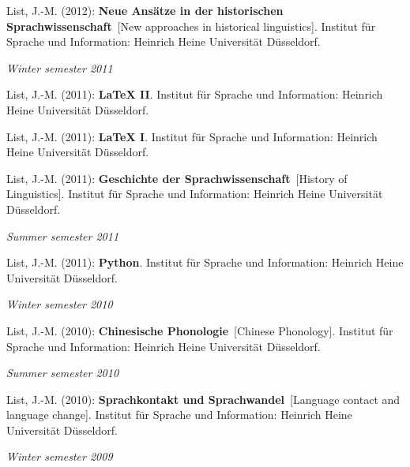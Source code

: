 \nopagebreak\noindent List, J.-M. (2012): \textbf{Neue Ansätze in der historischen Sprachwissenschaft}\ [New approaches in historical linguistics]. Institut für Sprache und Information: Heinrich Heine Universität Düsseldorf.\vspace{0.25cm}
\par
\noindent\textit{Winter semester 2011}\par\nopagebreak\vspace{0.25cm}
\nopagebreak\noindent List, J.-M. (2011): \textbf{LaTeX II}. Institut für Sprache und Information: Heinrich Heine Universität Düsseldorf.\vspace{0.25cm}
\par
\nopagebreak\noindent List, J.-M. (2011): \textbf{LaTeX I}. Institut für Sprache und Information: Heinrich Heine Universität Düsseldorf.\vspace{0.25cm}
\par
\nopagebreak\noindent List, J.-M. (2011): \textbf{Geschichte der Sprachwissenschaft}\ [History of Linguistics]. Institut für Sprache und Information: Heinrich Heine Universität Düsseldorf.\vspace{0.25cm}
\par
\noindent\textit{Summer semester 2011}\par\nopagebreak\vspace{0.25cm}
\nopagebreak\noindent List, J.-M. (2011): \textbf{Python}. Institut für Sprache und Information: Heinrich Heine Universität Düsseldorf.\vspace{0.25cm}
\par
\noindent\textit{Winter semester 2010}\par\nopagebreak\vspace{0.25cm}
\nopagebreak\noindent List, J.-M. (2010): \textbf{Chinesische Phonologie}\ [Chinese Phonology]. Institut für Sprache und Information: Heinrich Heine Universität Düsseldorf.\vspace{0.25cm}
\par
\noindent\textit{Summer semester 2010}\par\nopagebreak\vspace{0.25cm}
\nopagebreak\noindent List, J.-M. (2010): \textbf{Sprachkontakt und Sprachwandel}\ [Language contact and language change]. Institut für Sprache und Information: Heinrich Heine Universität Düsseldorf.\vspace{0.25cm}
\par
\noindent\textit{Winter semester 2009}\par\nopagebreak\vspace{0.25cm}
